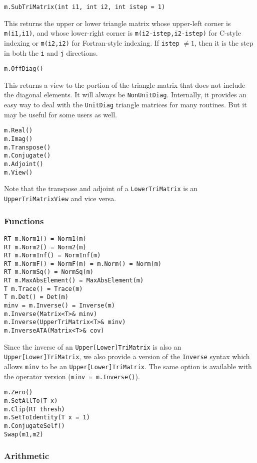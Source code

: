 \documentclass[twoside,letterpaper,11pt]{article}
\renewcommand{\tt}[1]{{\texttt {#1}}}
\begin{document}
\begin{verbatim}
m.SubTriMatrix(int i1, int i2, int istep = 1)
\end{verbatim}
This returns the upper or lower triangle matrix whose upper-left
corner is \tt{m(i1,i1)}, and whose lower-right corner is 
\tt{m(i2-istep,i2-istep)} for C-style indexing or \tt{m(i2,i2)} 
for Fortran-style indexing.  If \tt{istep} $\neq 1$, then it is the 
step in both the \tt{i} and \tt{j} directions.

\begin{verbatim}
m.OffDiag()
\end{verbatim}
This returns a view to the portion of the triangle matrix that does not include
the diagonal elements.  It will always be \tt{NonUnitDiag}.
Internally, it provides an easy way to deal with the \tt{UnitDiag} triangle matrices
for many routines.  But it may be useful for some users as well.

\begin{verbatim}
m.Real()
m.Imag()
m.Transpose()
m.Conjugate()
m.Adjoint()
m.View()
\end{verbatim}
Note that the transpose and adjoint of a \tt{LowerTriMatrix} is an
\tt{UpperTriMatrixView} and vice versa.

\subsubsection{Functions}

\begin{verbatim}
RT m.Norm1() = Norm1(m)
RT m.Norm2() = Norm2(m)
RT m.NormInf() = NormInf(m)
RT m.NormF() = NormF(m) = m.Norm() = Norm(m)
RT m.NormSq() = NormSq(m)
RT m.MaxAbsElement() = MaxAbsElement(m)
T m.Trace() = Trace(m)
T m.Det() = Det(m)
minv = m.Inverse() = Inverse(m)
m.Inverse(Matrix<T>& minv)
m.Inverse(UpperTriMatrix<T>& minv)
m.InverseATA(Matrix<T>& cov)
\end{verbatim}
Since the inverse of an \tt{Upper[Lower]TriMatrix} is also an 
\tt{Upper[Lower]TriMatrix},
we also provide a version of the \tt{Inverse} syntax which allows \tt{minv}
to be an \tt{Upper[Lower]TriMatrix}.  
The same option is available with the operator version (\tt{minv = m.Inverse()}).

\begin{verbatim}
m.Zero()
m.SetAllTo(T x)
m.Clip(RT thresh)
m.SetToIdentity(T x = 1)
m.ConjugateSelf()
Swap(m1,m2)
\end{verbatim}

\subsubsection{Arithmetic}
\end{document}
